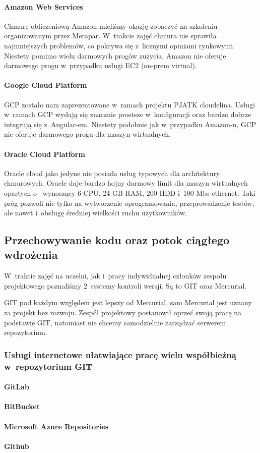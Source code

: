 \paragraph{Amazon Web Services}
Chmurę obliczeniową Amazon mieliśmy okazję zobaczyć na szkoleniu organizowanym przez Merapar.
W~trakcie zajęć chmura nie sprawiła najmniejszych problemów, co pokrywa się z~licznymi opiniami rynkowymi.
Niestety pomimo wielu darmowych progów zużycia, Amazon nie oferuje darmowego progu w~przypadku usługi EC2 (\gls{on-prem} virtual).

\paragraph{Google Cloud Platform}
GCP zostało nam zaprezentowane w~ramach projektu PJATK cloudelina.
Usługi w~ramach GCP wydają się znacznie prostsze w~konfiguracji oraz bardzo dobrze integrują się z~Angular-em.
Niestety podobnie jak w~przypadku Amazon-u, GCP nie oferuje darmowego progu dla maszyn wirtualnych.

\paragraph{Oracle Cloud Platform}
Oracle cloud jako jedyne nie posiada usług typowych dla architektury chmurowych.
Oracle daje bardzo hojny darmowy limit dla maszyn wirtualnych opartych o~ wynoszący 6 CPU, 24 GB RAM, 200 HDD i~100 Mbs ethernet.
Taki próg pozwoli nie tylko na wytworzenie oprogramowania, przeprowadzenie testów, ale nawet i~obsługę średniej wielkości ruchu użytkowników.

\subsection{Przechowywanie kodu oraz potok ciągłego wdrożenia}
\label{subsec:przechowywanie-kodu-oraz-potok-ciagego-wdrozenia}

W~trakcie zajęć na uczelni, jak i~pracy indywidualnej członków zespołu projektowego poznaliśmy 2~systemy kontroli wersji.
Są to GIT oraz Mercurial.

GIT pod każdym względem jest lepszy od Mercurial, sam Mercurial jest uznany za projekt bez rozwoju.
Zespół projektowy postanowił oprzeć swoją pracę na podstawie GIT, natomiast nie chcemy samodzielnie zarządzać serwerem repozytorium.

\subsubsection{Usługi internetowe ułatwiające pracę wielu współbieżną w~repozytorium GIT}
\paragraph{GitLab}
\paragraph{BitBucket}
\paragraph{Microsoft Azure Repositories}
\paragraph{Github}
